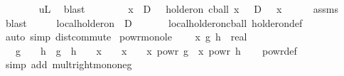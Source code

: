 \begin{isabellebody}
\ \ \ \ \ \ \isamarkupfalse%
\ uL\ \isamarkupfalse%
\ blast\isanewline
\ \ \isacommand{{\isacharbraceright}{\kern0pt}}\isamarkupfalse%
\isanewline
\ \ \isamarkupfalse%
\ \isamarkupfalse%
\ {\isachardoublequoteopen}x\ {\isasymin}\ D\ {\isasymLongrightarrow}\ {\isasymexists}{\isasymepsilon}{\isachargreater}{\kern0pt}{}{\isachardot}{\kern0pt}\ {\isacharparenleft}{\kern0pt}{}{\isacharminus}{\kern0pt}holder{\isacharunderscore}{\kern0pt}on\ {\isacharparenleft}{\kern0pt}cball\ x\ {\isasymepsilon}\ {\isasyminter}\ D{\isacharparenright}{\kern0pt}\ {\isasymphi}{\isacharparenright}{\kern0pt}{\isachardoublequoteclose}\ \ x\isanewline
\ \ \ \ \isamarkupfalse%
\ assms\ \isamarkupfalse%
\ blast\isanewline
\ \ \isamarkupfalse%
\ \isamarkupfalse%
\ {\isachardoublequoteopen}local{\isacharunderscore}{\kern0pt}holder{\isacharunderscore}{\kern0pt}on\ {}\ D\ {\isasymphi}{\isachardoublequoteclose}\isanewline
\ \ \ \ \isamarkupfalse%
\ local{\isacharunderscore}{\kern0pt}holder{\isacharunderscore}{\kern0pt}on{\isacharunderscore}{\kern0pt}cball\ holder{\isacharunderscore}{\kern0pt}on{\isacharunderscore}{\kern0pt}def\ \isamarkupfalse%
\ {\isacharparenleft}{\kern0pt}auto\ simp{\isacharcolon}{\kern0pt}\ dist{\isacharunderscore}{\kern0pt}commute{\isacharparenright}{\kern0pt}\isanewline
{}\isamarkupfalse%
%
\endisatagproof
{\isafoldproof}%
%
\isadelimproof
\isanewline
%
\endisadelimproof
\isanewline
{}\isamarkupfalse%
\ powr{\isacharunderscore}{\kern0pt}mono{\isacharunderscore}{\kern0pt}le{}{\isacharcolon}{\kern0pt}\ \isanewline
\ \ \ x\ g\ h\ {\isacharcolon}{\kern0pt}{\isacharcolon}{\kern0pt}\ real\isanewline
\ \ \ {\isachardoublequoteopen}g\ {\isasymle}\ {}\ {\isasymLongrightarrow}\ h\ {\isasymle}\ g\ {\isasymLongrightarrow}\ h\ {\isachargreater}{\kern0pt}\ {}\ {\isasymLongrightarrow}\ x\ {\isasymle}\ {}\ {\isasymLongrightarrow}\ x\ {\isasymge}\ {}\ {\isasymLongrightarrow}\ x\ powr\ g\ {\isasymle}\ x\ powr\ h{\isachardoublequoteclose}\isanewline
%
\isadelimproof
\ \ %
\endisadelimproof
%
\isatagproof
{}\isamarkupfalse%
\ powr{\isacharunderscore}{\kern0pt}def\ \isamarkupfalse%
\ {\isacharparenleft}{\kern0pt}simp\ add{\isacharcolon}{\kern0pt}\ mult{\isacharunderscore}{\kern0pt}right{\isacharunderscore}{\kern0pt}mono{\isacharunderscore}{\kern0pt}neg{\isacharparenright}{\kern0pt}%

\end{isabellebody}
